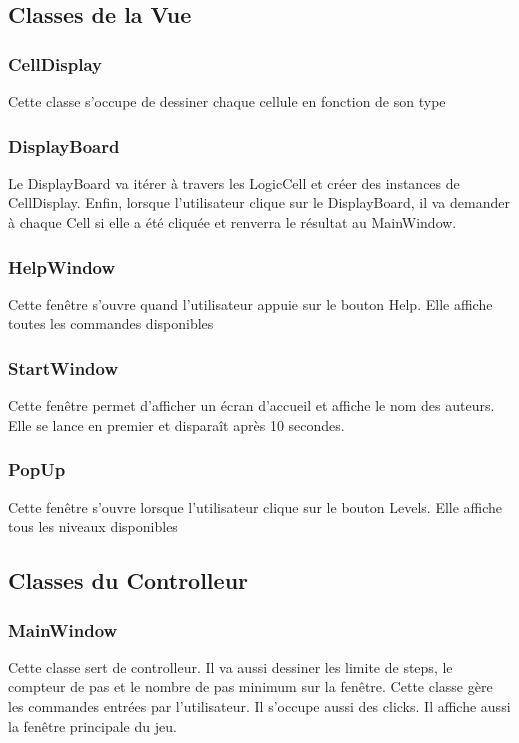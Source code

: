 \documentclass[utf8]{article}
\begin{document}
\begin{large}
\subsection{Classes de la Vue}
\subsubsection{CellDisplay}
\indent
\par
Cette classe s'occupe de dessiner chaque cellule en fonction de son type
\par
\subsubsection{DisplayBoard}
\indent
\par
Le DisplayBoard va itérer à travers les LogicCell et créer des instances de
CellDisplay. Enfin, lorsque l'utilisateur clique sur le
DisplayBoard, il va demander à chaque Cell si elle a été cliquée et renverra le
résultat au MainWindow.
\par
\subsubsection{HelpWindow}
\indent
\par
Cette fenêtre s'ouvre quand l'utilisateur appuie sur le bouton Help. Elle
affiche toutes les commandes disponibles
\par
\subsubsection{StartWindow}
\indent
\par
Cette fenêtre permet d'afficher un écran d'accueil et affiche le nom des
auteurs. Elle se lance en premier et disparaît après 10 secondes.
\par

\subsubsection{PopUp}
\indent
\par
Cette fenêtre s'ouvre lorsque l'utilisateur clique sur le bouton Levels. Elle
affiche tous les niveaux disponibles 

\subsection{Classes du Controlleur}
\subsubsection{MainWindow}
\indent
\par
Cette classe sert de controlleur. Il va aussi dessiner les limite de steps, le
compteur de pas et le nombre de pas minimum sur la fenêtre. Cette classe
gère les commandes entrées par l'utilisateur. Il s'occupe aussi des clicks.
Il affiche aussi la fenêtre principale du jeu.
\par

\end{large}
\end{document}

